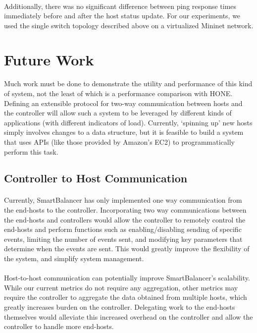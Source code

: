 \documentclass[10pt]{article}
\begin{document}
\paragraph{} Additionally, there was no significant difference between ping response times immediately before and after the host status update. For our experiments, we used the single switch topology described above on a virtualized Mininet network.

\section{Future Work}
\label{sec:future}

\paragraph{} Much work must be done to demonstrate the utility and performance of this kind of system, not the least of which is a performance comparison with HONE\cite{HONE}. Defining an extensible protocol for two-way communication between hosts and the controller will allow such a system to be leveraged by different kinds of applications (with different indicators of load). Currently, ‘spinning up’ new hosts simply involves changes to a data structure, but it is feasible to build a system that uses APIs (like those provided by Amazon’s EC2) to programmatically perform this task.

\subsection{Controller to Host Communication}

\paragraph{} Currently, SmartBalancer has only implemented one way communication from the end-hosts to the controller. Incorporating two way communications between the end-hosts and controllers would allow the controller to remotely control the end-hosts and perform functions such as enabling/disabling sending of specific events, limiting the number of events sent, and modifying key parameters that determine when the events are sent. This would greatly improve the flexibility of the system, and simplify system management.

\paragraph{} Host-to-host communication can potentially improve SmartBalancer’s scalability. While our current metrics do not require any aggregation, other metrics may require the controller to aggregate the data obtained from multiple hosts, which greatly increases burden on the controller. Delegating work to the end-hosts themselves would alleviate this increased overhead on the controller and allow the controller to handle more end-hosts.
\end{document}
